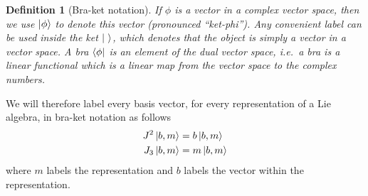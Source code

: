 \documentclass[11pt]{article}
\numberwithin{equation}{section}
\newtheorem{defn}{Definition}[section]
\begin{document}
\begin{defn}[Bra-ket notation] 
If $\phi$ is a vector in a complex vector space, then we use $\ket{\phi}$ to denote this vector (pronounced ``ket-phi''). Any convenient label can be used inside the ket $\ket{\ }$, which denotes that the object is simply a vector in a vector space. A bra $\bra{\phi}$ is an element of the dual vector space, i.e.\ a bra is a linear functional which is a linear map from the vector space to the complex numbers. 
\end{defn}

We will therefore label every basis vector, for every representation of a Lie algebra, in bra-ket notation as follows
\begin{align}
J^2 \ket{b, m} &= b \ket{b, m} \nonumber \\
J_3 \ket{b, m} &= m \ket{b, m}
\end{align}
where $m$ labels the representation and $b$ labels the vector within the representation.

\newpage
 
\end{document}
